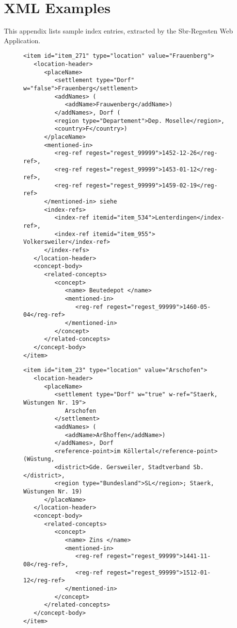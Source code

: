 \section{XML Examples}
\label{sec:examples}

This appendix lists sample index entries, extracted by the Sbr-Regesten Web Application.

\begin{figure}
\begin{verbatim}
<item id="item_271" type="location" value="Frauenberg">
   <location-header>
      <placeName>
         <settlement type="Dorf" w="false">Frauenberg</settlement>
         <addNames> (
            <addName>Frauwenberg</addName>)
         </addNames>, Dorf (
         <region type="Departement">Dep. Moselle</region>, 
         <country>F</country>) 
      </placeName>
      <mentioned-in>
         <reg-ref regest="regest_99999">1452-12-26</reg-ref>, 
         <reg-ref regest="regest_99999">1453-01-12</reg-ref>, 
         <reg-ref regest="regest_99999">1459-02-19</reg-ref>
      </mentioned-in> siehe 
      <index-refs>
         <index-ref itemid="item_534">Lenterdingen</index-ref>,
         <index-ref itemid="item_955"> Volkersweiler</index-ref>
      </index-refs>
   </location-header>
   <concept-body>
      <related-concepts>
         <concept>
            <name> Beutedepot </name>
            <mentioned-in>
               <reg-ref regest="regest_99999">1460-05-04</reg-ref>
            </mentioned-in>
         </concept>
      </related-concepts>
   </concept-body>
</item>
\end{verbatim}
\end{figure}

\begin{figure}
\begin{verbatim}
<item id="item_23" type="location" value="Arschofen">
   <location-header>
      <placeName>
         <settlement type="Dorf" w="true" w-ref="Staerk, Wüstungen Nr. 19">
            Arschofen
         </settlement>
         <addNames> (
            <addName>Arßhoffen</addName>)
         </addNames>, Dorf 
         <reference-point>im Köllertal</reference-point> (Wüstung, 
         <district>Gde. Gersweiler, Stadtverband Sb.</district>, 
         <region type="Bundesland">SL</region>; Staerk, Wüstungen Nr. 19) 
      </placeName>
   </location-header>
   <concept-body>
      <related-concepts>
         <concept>
            <name> Zins </name>
            <mentioned-in>
               <reg-ref regest="regest_99999">1441-11-08</reg-ref>, 
               <reg-ref regest="regest_99999">1512-01-12</reg-ref>
            </mentioned-in>
         </concept>
      </related-concepts>
   </concept-body>
</item>
\end{verbatim}
\end{figure}

